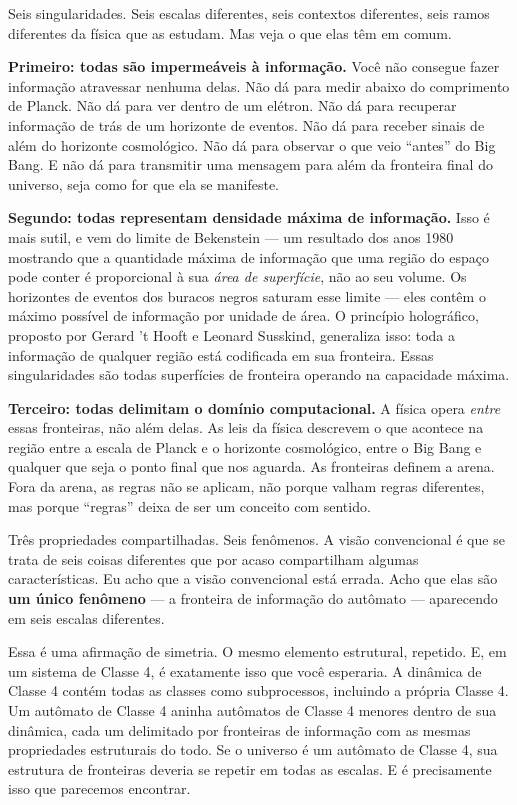 \documentclass[11pt, twoside, openright]{book}
\begin{document}
Seis singularidades. Seis escalas diferentes, seis contextos diferentes, seis ramos diferentes da física que as estudam. Mas veja o que elas têm em comum.

\textbf{Primeiro: todas são impermeáveis à informação.} Você não consegue fazer informação atravessar nenhuma delas. Não dá para medir abaixo do comprimento de Planck. Não dá para ver dentro de um elétron. Não dá para recuperar informação de trás de um horizonte de eventos. Não dá para receber sinais de além do horizonte cosmológico. Não dá para observar o que veio ``antes'' do Big Bang. E não dá para transmitir uma mensagem para além da fronteira final do universo, seja como for que ela se manifeste.

\textbf{Segundo: todas representam densidade máxima de informação.} Isso é mais sutil, e vem do limite de Bekenstein --- um resultado dos anos 1980 mostrando que a quantidade máxima de informação que uma região do espaço pode conter é proporcional à sua \textit{área de superfície}, não ao seu volume. Os horizontes de eventos dos buracos negros saturam esse limite --- eles contêm o máximo possível de informação por unidade de área. O princípio holográfico, proposto por Gerard 't Hooft e Leonard Susskind, generaliza isso: toda a informação de qualquer região está codificada em sua fronteira. Essas singularidades são todas superfícies de fronteira operando na capacidade máxima.

\textbf{Terceiro: todas delimitam o domínio computacional.} A física opera \textit{entre} essas fronteiras, não além delas. As leis da física descrevem o que acontece na região entre a escala de Planck e o horizonte cosmológico, entre o Big Bang e qualquer que seja o ponto final que nos aguarda. As fronteiras definem a arena. Fora da arena, as regras não se aplicam, não porque valham regras diferentes, mas porque ``regras'' deixa de ser um conceito com sentido.

Três propriedades compartilhadas. Seis fenômenos. A visão convencional é que se trata de seis coisas diferentes que por acaso compartilham algumas características. Eu acho que a visão convencional está errada. Acho que elas são \textbf{um único fenômeno} --- a fronteira de informação do autômato --- aparecendo em seis escalas diferentes.

Essa é uma afirmação de simetria. O mesmo elemento estrutural, repetido. E, em um sistema de Classe 4, é exatamente isso que você esperaria. A dinâmica de Classe 4 contém todas as classes como subprocessos, incluindo a própria Classe 4. Um autômato de Classe 4 aninha autômatos de Classe 4 menores dentro de sua dinâmica, cada um delimitado por fronteiras de informação com as mesmas propriedades estruturais do todo. Se o universo é um autômato de Classe 4, sua estrutura de fronteiras deveria se repetir em todas as escalas. E é precisamente isso que parecemos encontrar.
\end{document}
